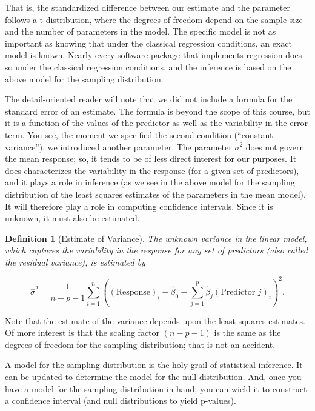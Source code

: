 \documentclass[
]{book}
\theoremstyle{plain}
\theoremstyle{mydefn}
\newtheorem{definition}{Definition}[chapter]
\theoremstyle{myexmpl}
\theoremstyle{remark}
\begin{document}
That is, the standardized difference between our estimate and the parameter follows a t-distribution, where the degrees of freedom depend on the sample size and the number of parameters in the model. The specific model is not as important as knowing that under the classical regression conditions, an exact model is known. Nearly every software package that implements regression does so under the classical regression conditions, and the inference is based on the above model for the sampling distribution.

The detail-oriented reader will note that we did not include a formula for the standard error of an estimate. The formula is beyond the scope of this course, but it is a function of the values of the predictor as well as the variability in the error term. You see, the moment we specified the second condition (``constant variance''), we introduced another parameter. The parameter \(\sigma^2\) does not govern the mean response; so, it tends to be of less direct interest for our purposes. It does characterizes the variability in the response (for a given set of predictors), and it plays a role in inference (as we see in the above model for the sampling distribution of the least squares estimates of the parameters in the mean model). It will therefore play a role in computing confidence intervals. Since it is unknown, it must also be estimated.

\begin{definition}[Estimate of Variance]
\protect\hypertarget{def:defn-estimate-sigma2}{}{\label{def:defn-estimate-sigma2} {} }The unknown variance in the linear model, which captures the variability in the response for any set of predictors (also called the residual variance), is estimated by

\[\widehat{\sigma}^2 = \frac{1}{n-p-1} \sum\limits_{i=1}^{n} \left((\text{Response})_i - \widehat{\beta}_0 - \sum\limits_{j=1}^{p} \widehat{\beta}_j (\text{Predictor } j)_{i}\right)^2.\]
\end{definition}

Note that the estimate of the variance depends upon the least squares estimates. Of more interest is that the scaling factor \((n - p - 1)\) is the same as the degrees of freedom for the sampling distribution; that is not an accident.

A model for the sampling distribution is the holy grail of statistical inference. It can be updated to determine the model for the null distribution. And, once you have a model for the sampling distribution in hand, you can wield it to construct a confidence interval (and null distributions to yield p-values).
\end{document}
